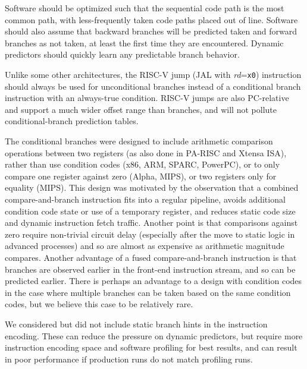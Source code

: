 Software should be optimized such that the sequential code path is the
most common path, with less-frequently taken code paths placed out of
line.  Software should also assume that backward branches will be
predicted taken and forward branches as not taken, at least the
first time they are encountered.  Dynamic predictors should quickly
learn any predictable branch behavior.

Unlike some other architectures, the RISC-V jump (JAL with {\em
  rd}={\tt x0}) instruction should always be used for unconditional
branches instead of a conditional branch instruction with an
always-true condition.  RISC-V jumps are also PC-relative and support
a much wider offset range than branches, and will not pollute
conditional-branch prediction tables.

\begin{commentary}
The conditional branches were designed to include arithmetic
comparison operations between two registers (as also done in PA-RISC
and Xtensa ISA), rather than use condition codes (x86, ARM, SPARC,
PowerPC), or to only compare one register against zero (Alpha, MIPS),
or two registers only for equality (MIPS).  This design was motivated
by the observation that a combined compare-and-branch instruction fits
into a regular pipeline, avoids additional condition code state or use
of a temporary register, and reduces static code size and dynamic
instruction fetch traffic.  Another point is that comparisons against
zero require non-trivial circuit delay (especially after the move to
static logic in advanced processes) and so are almost as expensive as
arithmetic magnitude compares.  Another advantage of a fused
compare-and-branch instruction is that branches are observed earlier
in the front-end instruction stream, and so can be predicted earlier.
There is perhaps an advantage to a design with condition codes in the
case where multiple branches can be taken based on the same condition
codes, but we believe this case to be relatively rare.

We considered but did not include static branch hints in the
instruction encoding.  These can reduce the pressure on dynamic
predictors, but require more instruction encoding space and
software profiling for best results, and can result in poor
performance if production runs do not match profiling runs.


\end{commentary}
